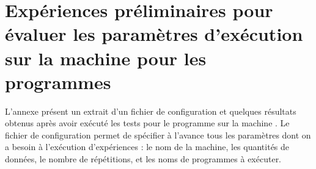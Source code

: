 
\chapter{Expériences préliminaires pour évaluer les paramètres
d'exécution sur la machine  pour les programmes
}
\label{ExperiencesPreliminairesWordCount.ann}

L'annexe pr\'esent un extrait d'un fichier de configuration et quelques r\'esultats obtenus apr\`es avoir ex\'ecut\'e les tests pour le programme  sur la machine . Le fichier de configuration permet de sp\'ecifier \`a l'avance tous les param\`etres dont on a besoin \`a l'ex\'ecution d'exp\'eriences : le nom de la machine, les quantit\'es de donn\'ees, le nombre de r\'ep\'etitions, et les noms de programmes \`a ex\'ecuter.  




\label{WordCount-temps-java-2-10.ann}
\label{WordCount-log-temps-java-2-10.ann}